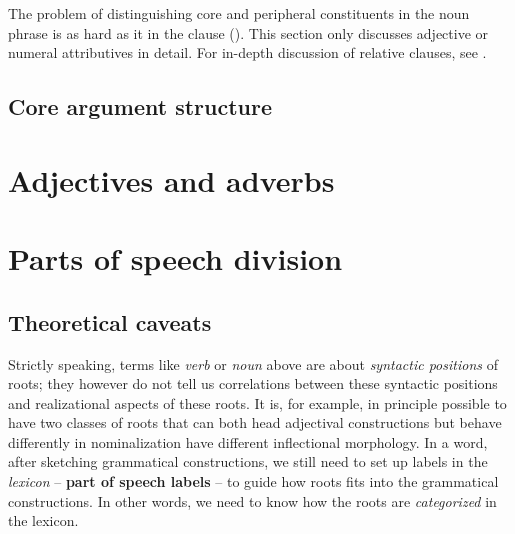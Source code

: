 \documentclass[a4paper, oneside, 12pt]{report}
\newcommand*{\concept}[1]{\textbf{#1}}
\newcommand*{\term}[1]{\emph{#1}}
\begin{document}
The problem of distinguishing core and peripheral constituents
in the noun phrase is as hard as it in the clause 
().
This section only discusses adjective or numeral attributives in detail.
For in-depth discussion of relative clauses, see .


\subsection{Core argument structure}\label{sec:grammatical.np.core}



\section{Adjectives and adverbs}



\section{Parts of speech division}\label{sec:grammatical.pos}

\subsection{Theoretical caveats}

Strictly speaking, terms like \term{verb} or \term{noun} above
are about \emph{syntactic positions} of roots;
they however do not tell us correlations between these syntactic positions
and realizational aspects of these roots.
It is, for example, in principle possible to have two classes of roots 
that can both head adjectival constructions
but behave differently in nominalization 
have different inflectional morphology.
In a word, after sketching grammatical constructions, 
we still need to set up labels in the \emph{lexicon} -- \concept{part of speech labels} --
to guide how roots fits into the grammatical constructions.
In other words, we need to know how the roots are \emph{categorized} in the lexicon.
\end{document}
